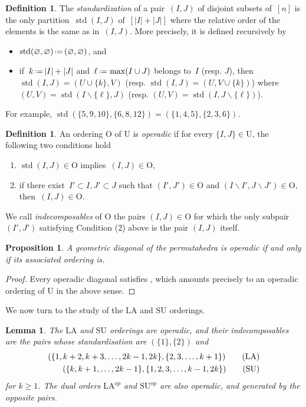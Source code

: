 \documentclass{amsart}
\newcommand{\darkblue}{\color{darkblue}} %
\newtheorem{proposition}[theorem]{Proposition}
\newtheorem{lemma}[theorem]{Lemma}
\theoremstyle{definition}
\newtheorem{definition}[theorem]{Definition}
\newcommand{\Un}{\mathrm{U}} %
\newcommand{\Or}{\mathrm{O}} %
\newcommand{\ssm}{\smallsetminus} %
\newcommand{\eqdef}{\mbox{\,\raisebox{0.2ex}{\scriptsize\ensuremath{\mathrm:}}\ensuremath{=}\,}} %
\DeclareMathOperator{\std}{std}
\newcommand{\defn}[1]{\textsl{\darkblue #1}} %
\newcommand{\SU}{\mathrm{SU}}
\newcommand{\LA}{\mathrm{LA}}
\begin{document}
\begin{definition}
The \defn{standardization} of a pair~$(I,J)$ of disjoint subsets of~$[n]$ is the only partition~$\std(I,J)$ of~$[|I|+|J|]$ where the relative order of the elements is the same as in~$(I,J)$.
More precisely, it is defined recursively by
\begin{itemize}
\item $\std(\varnothing, \varnothing) \eqdef (\varnothing, \varnothing)$, and
\item if~$k \eqdef |I|+|J|$ and~$\ell \eqdef \max(I \cup J)$ belongs to~$I$ (resp. $J$), then~$\std(I,J) = (U \cup \{k\}, V)$ (resp. $\std(I,J) \! = \! (U, V \cup \{k\})$) where~$(U,V) \! = \! \std(I \ssm \{\ell\}, J)$ (resp. ${(U,V) \! = \! \std(I, J \ssm \{\ell\})}$).
\end{itemize}
\end{definition}

For example, $\std(\{5,9,10\},\{6,8,12\}) = (\{1,4,5\},\{2,3,6\})$.

\begin{definition}
\label{def:operadicOrdering}
An ordering $\Or$ of $\Un$ is \defn{operadic} if for every $\{I,J\} \in \Un$, the following two conditions hold
\begin{enumerate}
\item $\std(I,J) \in \Or$ implies~$(I,J) \in \Or$,
\item if there exist~$I'\subset I, J'\subset J$ such that $(I',J') \in \Or$ and $(I\ssm I',J\ssm J') \in \Or$, then~$(I,J) \in \Or$.
\end{enumerate}
We call \defn{indecomposables} of $\Or$ the pairs $(I,J) \in \Or$ for which the only subpair $(I',J')$ satisfying Condition (2) above is the pair $(I,J)$ itself.
\end{definition}

\begin{proposition}
\label{prop:equiv-operadic}
A geometric diagonal of the permutahedra is operadic if and only if its associated ordering is. 
\end{proposition}

\begin{proof}
Every operadic diagonal satisfies \cite[Prop.~4.14]{LaplanteAnfossi}, which amounts precisely to an operadic ordering of $\Un$ in the above sense. 
\end{proof}

We now turn to the study of the $\LA$ and $\SU$ orderings.

\begin{lemma} 
\label{lem:operadic-ordering}
The $\LA$ and $\SU$ orderings are operadic, and their indecomposables are the pairs whose standardisation are $(\{1\},\{2\})$ and
\begin{align}
(\{1,k+2,k+3,\dots,2k-1,2k\}, \{2,3,\dots,k+1\}) \tag{$\LA$} \label{eq:std-LA} \\
(\{k,k+1,\dots,2k-1\},\{1,2,3,\dots,k-1,2k\}) \tag{$\SU$}
\end{align} 
for $k\geq 1$. 
The dual orders $\LA^{op}$ and $\SU^{op}$ are also operadic, and generated by the opposite pairs.
\end{lemma}
\end{document}

